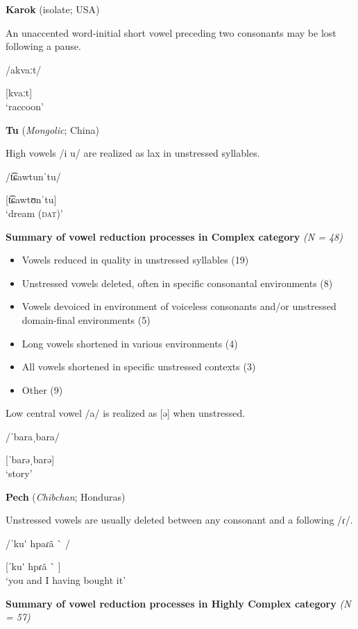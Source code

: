 \ea   \textbf{Karok} (isolate; USA)

An unaccented word-initial short vowel preceding two consonants may be lost following a pause.

/akvaːt/

[kvaːt]\\
\glt ‘raccoon’
\citep[53]{Bright1957}

\ex  \textbf{Tu} (\textit{Mongolic}; China)

High vowels /i u/ are realized as lax in unstressed syllables. 

/t͡ɕawtunˈtu/

[t͡ɕawtʊnˈtu]\\
\glt ‘dream (\textsc{dat})’
\citep[35]{Slater2003}
\z
\z

\ea\label{ex:6.18}
  \textbf{Summary of vowel reduction processes in Complex category} \textit{(N = 48)}

\begin{itemize}
\item Vowels reduced in quality in unstressed syllables (19)
\item Unstressed vowels deleted, often in specific consonantal environments (8)
\item Vowels devoiced in environment of voiceless consonants and/or unstressed domain-final environments  {(5)}
\item Long vowels shortened in various environments  {(4)}
\item All vowels shortened in specific unstressed contexts (3)
\item Other (9)
\end{itemize}

\ea{}

Low central vowel /a/ is realized as [ə] when unstressed.

/ˈbaraˌbara/

[ˈbarəˌbarə]\\
\glt ‘story’
\citep[17-18]{Rumsey1978}

\ex  \textbf{Pech} (\textit{Chibchan}; Honduras)

Unstressed vowels are usually deleted between any consonant and a following /ɾ/.

/ˈku\'{} hpaɾã \`{} /

[ˈku\'{} hpɾã \`{} ]\\
\glt ‘you and I having bought it’
\citep[23]{Holt1999}
\z
\z

\ea\label{ex:6.19}
  \textbf{Summary of vowel reduction processes in Highly Complex category} \textit{(N = 57)}

